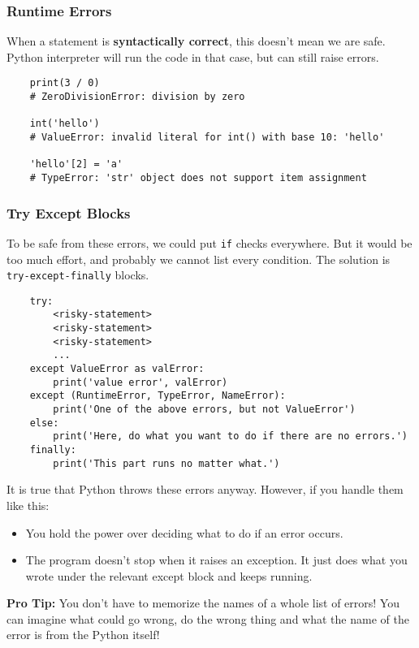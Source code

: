\documentclass[a4paper]{article}
\begin{document}
\subsubsection{Runtime Errors}
When a statement is \textbf{syntactically correct}, this doesn't mean we are safe. Python interpreter will run the code in that case, but can still raise errors.
\begin{lstlisting}
    print(3 / 0)
    # ZeroDivisionError: division by zero
    
    int('hello')
    # ValueError: invalid literal for int() with base 10: 'hello'
    
    'hello'[2] = 'a'
    # TypeError: 'str' object does not support item assignment
\end{lstlisting}{}

\subsubsection{Try Except Blocks}
To be safe from these errors, we could put \texttt{if} checks everywhere. But it would be too much effort, and probably we cannot list every condition. The solution is \texttt{try-except-finally} blocks.

\begin{lstlisting}
    try:
        <risky-statement>
        <risky-statement>
        <risky-statement>
        ...
    except ValueError as valError:
        print('value error', valError)
    except (RuntimeError, TypeError, NameError):
        print('One of the above errors, but not ValueError')
    else:
        print('Here, do what you want to do if there are no errors.')
    finally:
        print('This part runs no matter what.')
\end{lstlisting}{}
It is true that Python throws these errors anyway. However, if you handle them like this:
\begin{itemize}
    \item You hold the power over deciding what to do if an error occurs.
    \item The program doesn't stop when it raises an exception. It just does what you wrote under the relevant except block and keeps running.
\end{itemize}{}

\textbf{Pro Tip:} You don't have to memorize the names of a whole list of errors! You can imagine what could go wrong, do the wrong thing and what the name of the error is from the Python itself!
\end{document}
